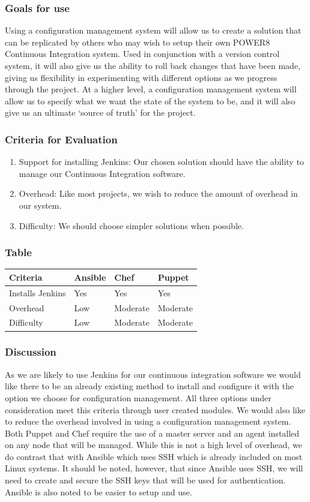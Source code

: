 \documentclass[10pt,letterpaper,onecolumn,draftclsnofoot]{IEEEtran}
\begin{document}
\subsubsection{Goals for use}
Using a configuration management system will allow us to create a solution that can be replicated by others who may wish to setup their own POWER8 Continuous Integration system.
Used in conjunction with a version control system, it will also give us the ability to roll back changes that have been made, giving us flexibility in experimenting with different options as we progress through the project. 
At a higher level, a configuration management system will allow us to specify what we want the state of the system to be, and it will also give us an ultimate `source of truth' for the project.
\subsubsection{Criteria for Evaluation}
\begin{enumerate}
  \item Support for installing Jenkins: Our chosen solution should have the ability to manage our Continuous Integration software. 
  \item Overhead: Like most projects, we wish to reduce the amount of overhead in our system.
  \item Difficulty: We should choose simpler solutions when possible.
\end{enumerate}
\subsubsection{Table}
\begin{center}
  \begin{tabular}{llll}
    Criteria & Ansible & Chef & Puppet \\ \midrule
    Installs Jenkins       & Yes & Yes & Yes \\ \midrule
    Overhead           & Low & Moderate & Moderate \\ \midrule
    Difficulty           & Low & Moderate & Moderate \\ \bottomrule
  \end{tabular}
\end{center}
\subsubsection{Discussion}
As we are likely to use Jenkins for our continuous integration software we would like there to be an already existing method to install and configure it with the option we choose for configuration management.
All three options under consideration meet this criteria through user created modules.
We would also like to reduce the overhead involved in using a configuration management system.
Both Puppet and Chef require the use of a master server and an agent installed on any node that will be managed.
While this is not a high level of overhead, we do contrast that with Ansible which uses SSH which is already included on most Linux systems.
It should be noted, however, that since Ansible uses SSH, we will need to create and secure the SSH keys that will be used for authentication.
Ansible is also noted to be easier to setup and use.~\cite{cmcompare}
\end{document}
